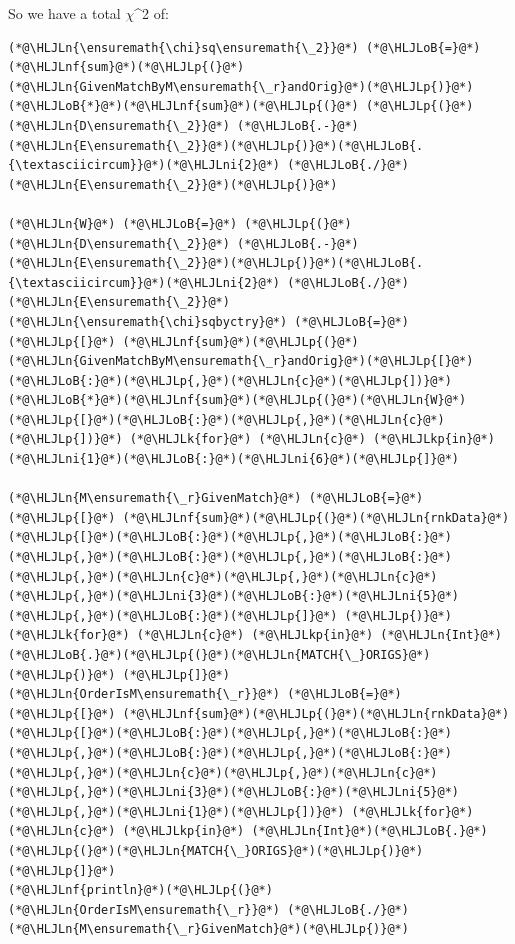 \documentclass[12pt,a4paper]{article}
\newcommand{\HLJLk}[1]{\textcolor[RGB]{148,91,176}{\textbf{#1}}}
\newcommand{\HLJLkp}[1]{\textcolor[RGB]{148,91,176}{\textbf{#1}}}
\newcommand{\HLJLn}[1]{#1}
\newcommand{\HLJLnf}[1]{\textcolor[RGB]{66,102,213}{#1}}
\newcommand{\HLJLni}[1]{\textcolor[RGB]{59,151,46}{#1}}
\newcommand{\HLJLoB}[1]{\textcolor[RGB]{102,102,102}{\textbf{#1}}}
\newcommand{\HLJLp}[1]{#1}
\begin{document}
So we have a total \ensuremath{\chi}\^{}2 of:


\begin{lstlisting}
(*@\HLJLn{\ensuremath{\chi}sq\ensuremath{\_2}}@*) (*@\HLJLoB{=}@*) (*@\HLJLnf{sum}@*)(*@\HLJLp{(}@*)(*@\HLJLn{GivenMatchByM\ensuremath{\_r}andOrig}@*)(*@\HLJLp{)}@*)(*@\HLJLoB{*}@*)(*@\HLJLnf{sum}@*)(*@\HLJLp{(}@*) (*@\HLJLp{(}@*)(*@\HLJLn{D\ensuremath{\_2}}@*) (*@\HLJLoB{.-}@*) (*@\HLJLn{E\ensuremath{\_2}}@*)(*@\HLJLp{)}@*)(*@\HLJLoB{.{\textasciicircum}}@*)(*@\HLJLni{2}@*) (*@\HLJLoB{./}@*) (*@\HLJLn{E\ensuremath{\_2}}@*)(*@\HLJLp{)}@*)

(*@\HLJLn{W}@*) (*@\HLJLoB{=}@*) (*@\HLJLp{(}@*)(*@\HLJLn{D\ensuremath{\_2}}@*) (*@\HLJLoB{.-}@*) (*@\HLJLn{E\ensuremath{\_2}}@*)(*@\HLJLp{)}@*)(*@\HLJLoB{.{\textasciicircum}}@*)(*@\HLJLni{2}@*) (*@\HLJLoB{./}@*) (*@\HLJLn{E\ensuremath{\_2}}@*)
(*@\HLJLn{\ensuremath{\chi}sqbyctry}@*) (*@\HLJLoB{=}@*) (*@\HLJLp{[}@*) (*@\HLJLnf{sum}@*)(*@\HLJLp{(}@*)(*@\HLJLn{GivenMatchByM\ensuremath{\_r}andOrig}@*)(*@\HLJLp{[}@*)(*@\HLJLoB{:}@*)(*@\HLJLp{,}@*)(*@\HLJLn{c}@*)(*@\HLJLp{])}@*)(*@\HLJLoB{*}@*)(*@\HLJLnf{sum}@*)(*@\HLJLp{(}@*)(*@\HLJLn{W}@*)(*@\HLJLp{[}@*)(*@\HLJLoB{:}@*)(*@\HLJLp{,}@*)(*@\HLJLn{c}@*)(*@\HLJLp{])}@*) (*@\HLJLk{for}@*) (*@\HLJLn{c}@*) (*@\HLJLkp{in}@*) (*@\HLJLni{1}@*)(*@\HLJLoB{:}@*)(*@\HLJLni{6}@*)(*@\HLJLp{]}@*)

(*@\HLJLn{M\ensuremath{\_r}GivenMatch}@*) (*@\HLJLoB{=}@*)(*@\HLJLp{[}@*) (*@\HLJLnf{sum}@*)(*@\HLJLp{(}@*)(*@\HLJLn{rnkData}@*)(*@\HLJLp{[}@*)(*@\HLJLoB{:}@*)(*@\HLJLp{,}@*)(*@\HLJLoB{:}@*)(*@\HLJLp{,}@*)(*@\HLJLoB{:}@*)(*@\HLJLp{,}@*)(*@\HLJLoB{:}@*)(*@\HLJLp{,}@*)(*@\HLJLn{c}@*)(*@\HLJLp{,}@*)(*@\HLJLn{c}@*)(*@\HLJLp{,}@*)(*@\HLJLni{3}@*)(*@\HLJLoB{:}@*)(*@\HLJLni{5}@*)(*@\HLJLp{,}@*)(*@\HLJLoB{:}@*)(*@\HLJLp{]}@*) (*@\HLJLp{)}@*) (*@\HLJLk{for}@*) (*@\HLJLn{c}@*) (*@\HLJLkp{in}@*) (*@\HLJLn{Int}@*)(*@\HLJLoB{.}@*)(*@\HLJLp{(}@*)(*@\HLJLn{MATCH{\_}ORIGS}@*)(*@\HLJLp{)}@*) (*@\HLJLp{]}@*)
(*@\HLJLn{OrderIsM\ensuremath{\_r}}@*) (*@\HLJLoB{=}@*) (*@\HLJLp{[}@*) (*@\HLJLnf{sum}@*)(*@\HLJLp{(}@*)(*@\HLJLn{rnkData}@*)(*@\HLJLp{[}@*)(*@\HLJLoB{:}@*)(*@\HLJLp{,}@*)(*@\HLJLoB{:}@*)(*@\HLJLp{,}@*)(*@\HLJLoB{:}@*)(*@\HLJLp{,}@*)(*@\HLJLoB{:}@*)(*@\HLJLp{,}@*)(*@\HLJLn{c}@*)(*@\HLJLp{,}@*)(*@\HLJLn{c}@*)(*@\HLJLp{,}@*)(*@\HLJLni{3}@*)(*@\HLJLoB{:}@*)(*@\HLJLni{5}@*)(*@\HLJLp{,}@*)(*@\HLJLni{1}@*)(*@\HLJLp{])}@*) (*@\HLJLk{for}@*) (*@\HLJLn{c}@*) (*@\HLJLkp{in}@*) (*@\HLJLn{Int}@*)(*@\HLJLoB{.}@*)(*@\HLJLp{(}@*)(*@\HLJLn{MATCH{\_}ORIGS}@*)(*@\HLJLp{)}@*) (*@\HLJLp{]}@*)
(*@\HLJLnf{println}@*)(*@\HLJLp{(}@*)(*@\HLJLn{OrderIsM\ensuremath{\_r}}@*) (*@\HLJLoB{./}@*) (*@\HLJLn{M\ensuremath{\_r}GivenMatch}@*)(*@\HLJLp{)}@*)
\end{lstlisting}
\end{document}
